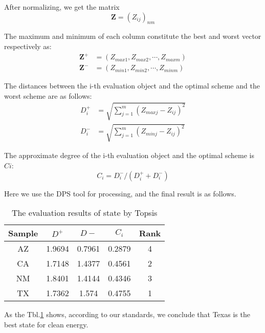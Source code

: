 \documentclass{mcmthesis}
\begin{document}
After normalizing, we get the matrix
\begin{equation}
  \mathbf{Z} = (Z_{ij})_{nm}
\end{equation}

The maximum and minimum of each column constitute the best and worst vector respectively as:
\begin{align}
  \mathbf{Z^+} &= (Z_{max1}, Z_{max2}, \cdots, Z_{maxm})   \\
  \mathbf{Z^-} &= (Z_{min1}, Z_{min2}, \cdots, Z_{minm})
\end{align}

The distances between the i-th evaluation object and the optimal scheme and the worst scheme are as follows:
\begin{align}
   D_i^+ &= \sqrt{ \sum\limits_{j=1}^m (Z_{maxj} - Z_{ij})^2 } \\
   D_i^- &= \sqrt{ \sum\limits_{j=1}^m (Z_{minj} - Z_{ij})^2 }
\end{align}

The approximate degree of the i-th evaluation object and the optimal scheme is $Ci$:
\begin{equation}
  C_i = D_i^- / (D_i^+ + D_i^-)
\end{equation}

Here we use the DPS tool for processing, and the final result is as follows.
\begin{table}[H]
\centering
\caption{The evaluation results of state by Topsis}
\label{Topsis}
\begin{tabular}{|c|c|c|c|c|}
\hline
Sample & $D^+$     & $D-$     & $C_i$     & Rank \\ \hline
AZ     & 1.9694 & 0.7961 & 0.2879 & 4    \\ \hline
CA     & 1.7148 & 1.4377 & 0.4561 & 2    \\ \hline
NM     & 1.8401 & 1.4144 & 0.4346 & 3    \\ \hline
TX     & 1.7362 & 1.574  & 0.4755 & 1    \\ \hline
\end{tabular}
\end{table}

As the Tbl.\ref{Topsis} shows, according to our standards, we conclude that Texas is the best state for clean energy.
\end{document}
